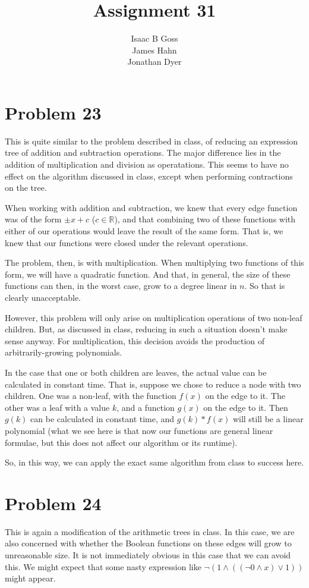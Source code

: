 \documentclass{article}
\author{Isaac B Goss\\ James Hahn\\ Jonathan Dyer}
\title{Assignment 31}
\providecommand{\prob}[1]{\section*{Problem #1}}
\providecommand{\R}{\mathbb{R}}
\begin{document}
\maketitle

\prob{23}
This is quite similar to the problem described in class, of reducing an expression tree of addition and subtraction operations.
The major difference lies in the addition of multiplication and division as operatations.
This seems to have no effect on the algorithm discussed in class, except when performing contractions on the tree.

When working with addition and subtraction, we knew that every edge function was of the form $\pm x + c$ ($c \in \R$), and that combining two of these functions with either of our operations would leave the result of the same form.
That is, we knew that our functions were closed under the relevant operations.

The problem, then, is with multiplication.
When multiplying two functions of this form, we will have a quadratic function.
And that, in general, the size of these functions can then, in the worst case, grow to a degree linear in $n$.
So that is clearly unacceptable.

However, this problem will only arise on multiplication operations of two non-leaf children.
But, as discussed in class, reducing in such a situation doesn't make sense anyway.
For multiplication, this decision avoids the production of arbitrarily-growing polynomials.

In the case that one or both children are leaves, the actual value can be calculated in constant time.
That is, suppose we chose to reduce a node with two children.
One was a non-leaf, with the function $f(x)$ on the edge to it.
The other was a leaf with a value $k$, and a function $g(x)$ on the edge to it.
Then $g(k)$ can be calculated in constant time, and $g(k)*f(x)$ will still be a linear polynomial
(what we see here is that now our functions are general linear formulae, but this does not affect our algorithm or its runtime).

So, in this way, we can apply the exact same algorithm from class to success here.

\prob{24}
This is again a modification of the arithmetic trees in class.
In this case, we are also concerned with whether the Boolean functions on these edges will grow to unreasonable size.
It is not immediately obvious in this case that we can avoid this.
We might expect that some nasty expression like $\lnot(1 \land ((\lnot 0 \land x ) \lor 1))$ might appear.
\end{document}
